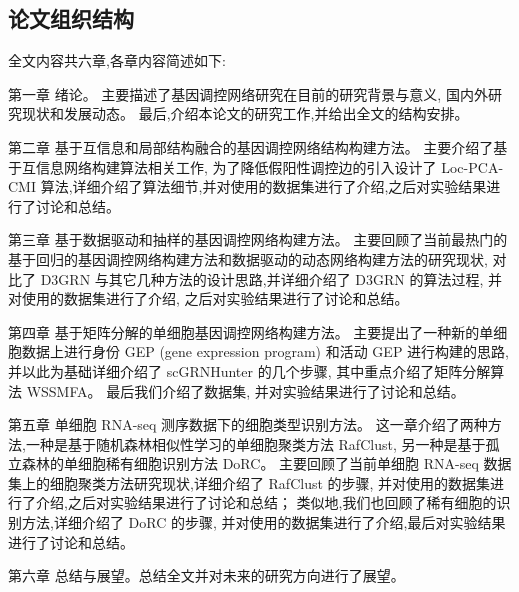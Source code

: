 \subsection{论文组织结构}

全文内容共六章,各章内容简述如下:

第一章 绪论。
主要描述了基因调控网络研究在目前的研究背景与意义, 国内外研究现状和发展动态。
最后,介绍本论文的研究工作,并给出全文的结构安排。

第二章 基于互信息和局部结构融合的基因调控网络结构构建方法。
主要介绍了基于互信息网络构建算法相关工作, 为了降低假阳性调控边的引入设计了 Loc-PCA-CMI 算法,详细介绍了算法细节,并对使用的数据集进行了介绍,之后对实验结果进行了讨论和总结。

第三章 基于数据驱动和抽样的基因调控网络构建方法。
主要回顾了当前最热门的基于回归的基因调控网络构建方法和数据驱动的动态网络构建方法的研究现状,
对比了 D3GRN 与其它几种方法的设计思路,并详细介绍了 D3GRN 的算法过程,
并对使用的数据集进行了介绍, 
之后对实验结果进行了讨论和总结。

第四章 基于矩阵分解的单细胞基因调控网络构建方法。
主要提出了一种新的单细胞数据上进行身份 GEP (gene expression program) 和活动 
GEP 进行构建的思路, 并以此为基础详细介绍了 scGRNHunter 的几个步骤, 其中重点介绍了矩阵分解算法 WSSMFA。
最后我们介绍了数据集, 并对实验结果进行了讨论和总结。



第五章 单细胞 RNA-seq 测序数据下的细胞类型识别方法。
这一章介绍了两种方法,一种是基于随机森林相似性学习的单细胞聚类方法 RafClust,
另一种是基于孤立森林的单细胞稀有细胞识别方法 DoRC。
主要回顾了当前单细胞 RNA-seq 数据集上的细胞聚类方法研究现状,详细介绍了 RafClust 的步骤,
并对使用的数据集进行了介绍,之后对实验结果进行了讨论和总结；
类似地,我们也回顾了稀有细胞的识别方法,详细介绍了 DoRC 的步骤,
并对使用的数据集进行了介绍,最后对实验结果进行了讨论和总结。

第六章 总结与展望。总结全文并对未来的研究方向进行了展望。